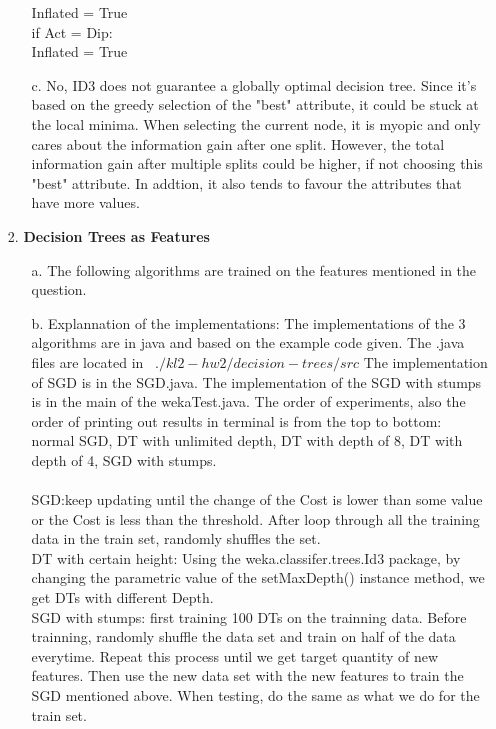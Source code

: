 \begin{enumerate}
\begin{enumerate}
				 \hspace*{25 mm}Inflated = True\\
				 \hspace*{15 mm}if Act = Dip:\\
				 \hspace*{20 mm}Inflated = True\\
		\item[c.] No, ID3 does not guarantee a globally optimal decision tree. Since it's based on the greedy selection of the "best" attribute, it could be stuck at the local minima. When selecting the current node, it is myopic and only cares about the information gain after one split. However, the total information gain after multiple splits could be higher, if not choosing this "best" attribute. In addtion, it also tends to favour the attributes that have more values.\\
	\end{enumerate}
\item[2.]\textbf{Decision Trees as Features}
	\begin{enumerate}
		\item[a.] The following algorithms are trained on the features mentioned in the question.
		\item[b.] Explannation of the implementations: The implementations of the 3 algorithms are in java and based on the example code given. The .java files are located in \ \(./kl2-hw2/decision-trees/src\) The implementation of SGD is in the SGD.java. The implementation of the SGD with stumps is in the main of the wekaTest.java. The order of experiments, also the order of printing out results in terminal is from the top to bottom: normal SGD, DT with unlimited depth, DT with depth of 8, DT with depth of 4, SGD with stumps.\\\\
				  SGD:keep updating until the change of the Cost is lower than some value or the Cost is less than the threshold. After loop through all the training data in the train set, randomly shuffles the set.\\
				  DT with certain height: Using the weka.classifer.trees.Id3 package, by changing the parametric value of the setMaxDepth() instance method, we get DTs with different Depth.\\
				  SGD with stumps: first training 100 DTs on the trainning data. Before trainning, randomly shuffle the data set and train on half of the data everytime. Repeat this process until we get target quantity of new features. Then use the new data set with the new features to train the SGD mentioned above. When testing, do the same as what we do for the train set.\\	

\end{enumerate}
\end{enumerate}
